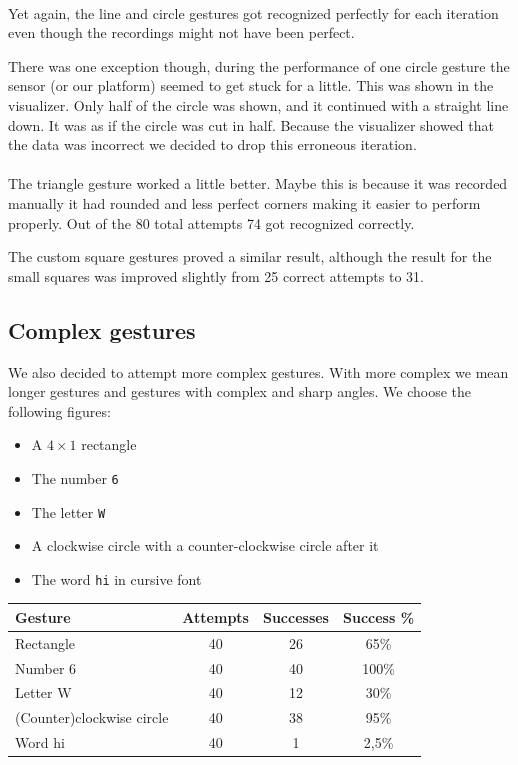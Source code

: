 \documentclass[a4paper]{article}
\providecommand{\tightlist}{%
\setlength{\itemsep}{0pt}\setlength{\parskip}{0pt}}
\begin{document}
  \paragraph{}
  Yet again, the line and circle gestures got recognized perfectly for each
  iteration even though the recordings might not have been perfect.

  There was one exception though, during the performance of one circle gesture
  the sensor (or our platform) seemed to get stuck for a little. This was shown
  in the visualizer. Only half of the circle was shown, and it continued with a
  straight line down. It was as if the circle was cut in half. Because the
  visualizer showed that the data was incorrect we decided to drop this erroneous
  iteration.

  \paragraph{}
  The triangle gesture worked a little better. Maybe this is because it was
  recorded manually it had rounded and less perfect corners making it easier to
  perform properly. Out of the 80 total attempts 74 got recognized correctly.

  The custom square gestures proved a similar result, although the result for
  the small squares was improved slightly from 25 correct attempts to 31.

  \subsection{Complex gestures}
  We also decided to attempt more complex gestures. With more complex we mean
  longer gestures and gestures with complex and sharp angles. We choose the
  following figures:

  \begin{itemize}
    \tightlist{}
    \item A $4\times1$ rectangle
    \item The number \verb_6_
    \item The letter \verb_W_
    \item A clockwise circle with a counter-clockwise circle after it
    \item The word \verb_hi_ in cursive font
  \end{itemize}

  \begin{center}
    \begin{tabular}{ |l|c|c|c| }
      \hline
      \textbf{Gesture} & \textbf{Attempts} &
      \textbf{Successes} & \textbf{Success \%} \\
      \hline
      Rectangle & 40 & 26 & 65\% \\
      \hline
      Number 6 & 40 & 40 & 100\% \\
      \hline
      Letter W & 40 & 12 & 30\% \\
      \hline
      (Counter)clockwise circle & 40 & 38 & 95\% \\
      \hline
      Word hi & 40 & 1 & 2,5\% \\
      \hline
    \end{tabular}
  \end{center}
\end{document}
